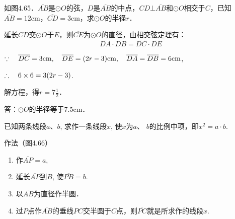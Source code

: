   
  \begin{example}
    如图4.65．$\overline{AB}$是$\odot O$的弦，$D$是$\overline{AB}$的中点，$CD\bot \overline{AB}$和$\odot O$相交于$C$，已知$\overline{AB}=12$cm，$\overline{CD}=3$cm，求$\odot O$的半径$r$．
  \end{example}
  
  \begin{solution}
  延长$CD$交$\odot O$于$E$，则$\overline{CE}$为$\odot O$的直径，由相交弦定理有：
  \[\overline{DA}\cdot \overline{DB}=\overline{DC}\cdot \overline{DE}\]
  
  $\because\quad \overline{DC}=3{\rm cm},\quad  \overline{DE}=(2r-3){\rm cm},\quad \overline{DA}=\overline{DB}=6{\rm cm}$,
  
  $\therefore\quad 6\times6=3(2r-3)$.
  
  解方程，得$r=7\frac{1}{2}$．
  
  答：$\odot O$的半径等于7.5cm．
  \end{solution}
  
  \begin{example}
    已知两条线段$a$、$b$, 求作一条线段$x$, 使$x$为$a$、
$b$的比例中项，即$x^2=a\cdot b$.
\end{example}

作法（图4.66）
\begin{enumerate}
    \item 作$\overline{AP}=a$,
    \item 延长$\overline{AP}$到$B$, 使$\overline{PB}=b$.
    \item 以$\overline{AB}$为直径作半圆．
    \item 过$P$点作$\overline{AB}$的垂线$PC$交半圆于$C$点，则$\overline{PC}$就是所求作的线段$x$.
\end{enumerate}

\begin{figure}[htp]
    \centering
{}
    \caption{}
\end{figure}


